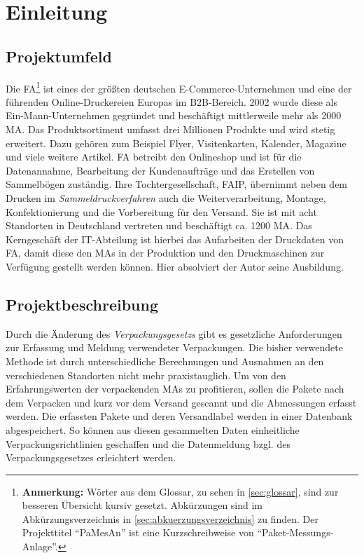 \section{Einleitung}

\subsection{Projektumfeld}

Die \ac{FA}\footnote{\textbf{Anmerkung:} Wörter aus dem Glossar, zu sehen in \vref{sec:glossar}, sind zur besseren Übersicht kursiv gesetzt. Abkürzungen sind im Abkürzungsverzeichnis in \vref{sec:abkuerzungsverzeichnis} zu finden. Der Projekttitel \enquote{PaMesAn} ist eine Kurzschreibweise von \enquote{Paket-Messungs-Anlage}.}
ist eines der größten deutschen E-Commerce-Unternehmen und eine der führenden Online-Druckereien Europas im B2B-Bereich. 2002 wurde diese als Ein-Mann-Unternehmen gegründet und beschäftigt mittlerweile mehr als 2000 \ac{MA}. Das Produktsortiment umfasst drei Millionen Produkte und wird stetig erweitert. Dazu gehören zum Beispiel Flyer, Visitenkarten, Kalender, Magazine und viele weitere Artikel. \ac{FA} betreibt den Onlineshop und ist für die Datenannahme, Bearbeitung der Kundenaufträge und das Erstellen von Sammelbögen zuständig. Ihre Tochtergesellschaft, \ac{FAIP}, übernimmt neben dem Drucken im \textit{\gls{Sammeldruckverfahren}} auch die Weiterverarbeitung, Montage, Konfektionierung und die Vorbereitung für den Versand. Sie ist mit acht Standorten in Deutschland vertreten und beschäftigt ca. 1200 \ac{MA}. Das Kerngeschäft der IT-Abteilung ist hierbei das Aufarbeiten der Druckdaten von \ac{FA}, damit diese den \acp{MA} in der Produktion und den Druckmaschinen zur Verfügung gestellt werden können. Hier absolviert der Autor seine Ausbildung.


\subsection{Projektbeschreibung}

Durch die Änderung des \textit{\glspl{Verpackungsgesetz}} gibt es gesetzliche Anforderungen zur Erfassung und Meldung verwendeter Verpackungen. Die bisher verwendete Methode ist durch unterschiedliche Berechnungen und Ausnahmen an den verschiedenen Standorten nicht mehr praxistauglich. Um von den Erfahrungswerten der verpackenden \acp{MA} zu profitieren, sollen die Pakete nach dem Verpacken und kurz vor dem Versand gescannt und die Abmessungen erfasst werden. Die erfassten Pakete und deren Versandlabel werden in einer Datenbank abgespeichert. So können aus diesen gesammelten Daten einheitliche Verpackungsrichtlinien geschaffen und die Datenmeldung bzgl. des Verpackungsgesetzes erleichtert werden.


